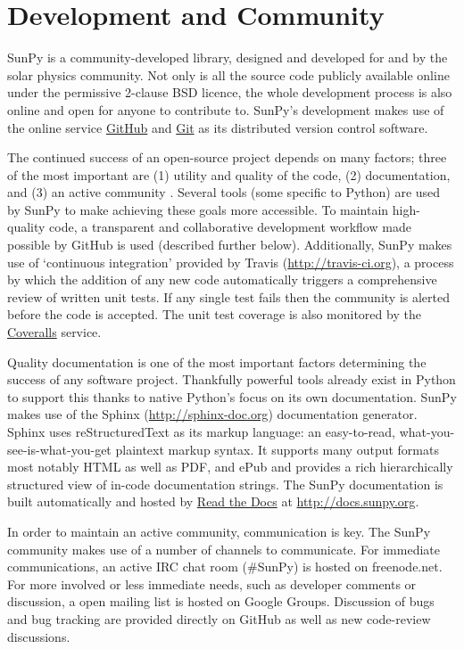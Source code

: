 \section{Development and Community}\label{sec:dev}
SunPy is a community-developed library, designed and developed for and by 
the solar physics community. Not only is all the source code publicly available 
online under the permissive 2-clause BSD licence, the whole 
development process is also online and open for anyone to contribute to.
SunPy's development makes use of the online service 
\href{http://github.com}{GitHub} and \href{http://git-scm.com/}{Git}
as its distributed version control software. 

The continued success of an open-source project depends on many factors;
three of the most important are (1) utility and quality of the code, (2) documentation, and (3) an
active community \cite{bangerth2013}. Several tools (some specific to Python) are used by
SunPy to make achieving these goals more accessible. To maintain high-quality code, a 
transparent and collaborative development workflow made possible by GitHub is used (described
further below).
Additionally, SunPy makes use of `continuous integration' provided by
Travis (\url{http://travis-ci.org}), a process by which the addition of any new code 
automatically triggers a comprehensive review of written unit tests. If any single test
fails then the community is alerted before the code is accepted. The unit test coverage is
also monitored by the \href{http://coveralls.io}{Coveralls} service.

Quality documentation is
one of the most important factors determining the success of any software project. 
Thankfully powerful tools already exist in Python to support this thanks to native
Python's focus on its own documentation. SunPy makes use of the Sphinx (\url{http://sphinx-doc.org})
documentation generator. Sphinx uses reStructuredText as its markup language: 
an easy-to-read, what-you-see-is-what-you-get plaintext markup syntax. It supports
many output formats most notably HTML as well as PDF, and ePub and provides a rich
hierarchically structured view of in-code documentation strings. The SunPy documentation 
is built automatically and hosted by \href{http://readthedocs.org}{Read the 
Docs} at \url{http://docs.sunpy.org}. 

In order to maintain an active community, communication is key.  The SunPy community makes
use of a number of channels to communicate. For immediate communications, an active IRC chat
room (\#SunPy) is hosted on freenode.net. For more involved or less immediate needs, such as
developer comments or discussion, a open mailing list is hosted on Google Groups. 
Discussion of bugs and bug tracking are provided directly on GitHub as well as new
code-review discussions.

